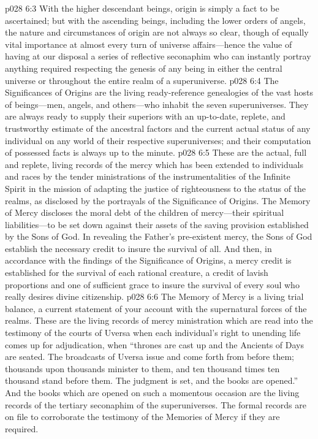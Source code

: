 \vs p028 6:3 With the higher descendant beings, origin is simply a fact to be ascertained; but with the ascending beings, including the lower orders of angels, the nature and circumstances of origin are not always so clear, though of equally vital importance at almost every turn of universe affairs---hence the value of having at our disposal a series of reflective seconaphim who can instantly portray anything required respecting the genesis of any being in either the central universe or throughout the entire realm of a superuniverse.
\vs p028 6:4 The Significances of Origins are the living ready\hyp{}reference genealogies of the vast hosts of beings---men, angels, and others---who inhabit the seven superuniverses. They are always ready to supply their superiors with an up\hyp{}to\hyp{}date, replete, and trustworthy estimate of the ancestral factors and the current actual status of any individual on any world of their respective superuniverses; and their computation of possessed facts is always up to the minute.
\pc \vs p028 6:5 \bibnobreakspace {} These are the actual, full and replete, living records of the mercy which has been extended to individuals and races by the tender ministrations of the instrumentalities of the Infinite Spirit in the mission of adapting the justice of righteousness to the status of the realms, as disclosed by the portrayals of the Significance of Origins. The Memory of Mercy discloses the moral debt of the children of mercy---their spiritual liabilities---to be set down against their assets of the saving provision established by the Sons of God. In revealing the Father’s pre\hyp{}existent mercy, the Sons of God establish the necessary credit to insure the survival of all. And then, in accordance with the findings of the Significance of Origins, a mercy credit is established for the survival of each rational creature, a credit of lavish proportions and one of sufficient grace to insure the survival of every soul who really desires divine citizenship.
\vs p028 6:6 The Memory of Mercy is a living trial balance, a current statement of your account with the supernatural forces of the realms. These are the living records of mercy ministration which are read into the testimony of the courts of Uversa when each individual’s right to unending life comes up for adjudication, when “thrones are cast up and the Ancients of Days are seated. The broadcasts of Uversa issue and come forth from before them; thousands upon thousands minister to them, and ten thousand times ten thousand stand before them. The judgment is set, and the books are opened.” And the books which are opened on such a momentous occasion are the living records of the tertiary seconaphim of the superuniverses. The formal records are on file to corroborate the testimony of the Memories of Mercy if they are required.
